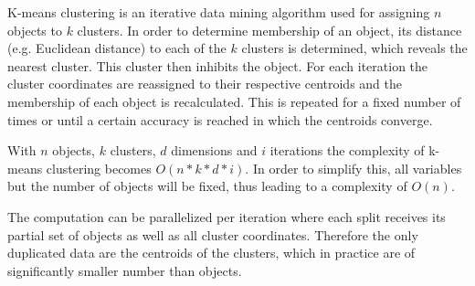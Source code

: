 K-means clustering is an iterative data mining algorithm used for assigning $n$ objects to $k$ clusters. In order to determine membership of an object, its distance (e.g. Euclidean distance) to each of the $k$ clusters is determined, which reveals the nearest cluster. This cluster then inhibits the object. For each iteration the cluster coordinates are reassigned to their respective centroids and the membership of each object is recalculated. This is repeated for a fixed number of times or until a certain accuracy is reached in which the centroids converge.

With $n$ objects, $k$ clusters, $d$ dimensions and $i$ iterations the complexity of k-means clustering becomes $O(n*k*d*i)$. In order to simplify this, all variables but the number of objects will be fixed, thus leading to a complexity of $O(n)$.

The computation can be parallelized per iteration where each split receives its partial set of objects as well as all cluster coordinates. Therefore the only duplicated data are the centroids of the clusters, which in practice are of significantly smaller number than objects.
